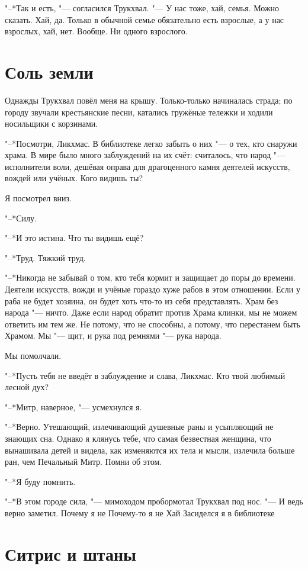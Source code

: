 \documentclass[a4paper,10pt,fleqn]{book}
\newcommand{\ldotst}{\so{...}\xspace}
\newcommand{\ldotsq}{\so{?\hbox{\hspace{-.212em}}..}\xspace}
\begin{document}
"--*Так и есть, "--- согласился Трукхвал.
"--- У нас тоже, хай, семья.
Можно сказать.
Хай, да.
Только в обычной семье обязательно есть взрослые, а у нас взрослых, хай, нет.
Вообще.
Ни одного взрослого.

\section{Соль земли}

Однажды Трукхвал повёл меня на крышу.
Только-только начиналась страда;
по городу звучали крестьянские песни, катались гружёные тележки и ходили носильщики с корзинами.

"--*Посмотри, Ликхмас.
В библиотеке легко забыть о них "--- о тех, кто снаружи храма.
В мире было много заблуждений на их счёт: считалось, что народ "--- исполнители воли, дешёвая оправа для драгоценного камня деятелей искусств, вождей или учёных.
Кого видишь ты?

Я посмотрел вниз.

"--*Силу.

"--*И это истина.
Что ты видишь ещё?

"--*Труд.
Тяжкий труд.

"--*Никогда не забывай о том, кто тебя кормит и защищает до поры до времени.
Деятели искусств, вожди и учёные гораздо хуже рабов в этом отношении.
Если у раба не будет хозяина, он будет хоть что-то из себя представлять.
Храм без народа "--- ничто.
Даже если народ обратит против Храма клинки, мы не можем ответить им тем же.
Не потому, что не способны, а потому, что перестанем быть Храмом.
Мы "--- щит, и рука под ремнями "--- рука народа.

Мы помолчали.

"--*Пусть тебя не введёт в заблуждение и слава, Ликхмас.
Кто твой любимый лесной дух?

"--*Митр, наверное, "--- усмехнулся я.

"--*Верно.
Утешающий, излечивающий душевные раны и усыпляющий не знающих сна.
Однако я клянусь тебе, что самая безвестная женщина, что вынашивала детей и видела, как изменяются их тела и мысли, излечила больше ран, чем Печальный Митр.
Помни об этом.

"--*Я буду помнить.

"--*В этом городе сила, "--- мимоходом пробормотал Трукхвал под нос.
"--- И ведь верно заметил.
Почему я не\ldotsq
Почему-то я не\ldotst
Хай\ldotst Засиделся я в библиотеке\ldotst

\section{Ситрис и штаны}
\end{document}
